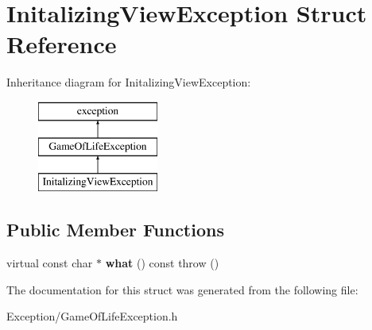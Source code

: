 \hypertarget{struct_initalizing_view_exception}{}\section{Initalizing\+View\+Exception Struct Reference}
\label{struct_initalizing_view_exception}
Inheritance diagram for Initalizing\+View\+Exception\+:\begin{figure}[H]
\begin{center}
\leavevmode
\includegraphics[height=3.000000cm]{struct_initalizing_view_exception}
\end{center}
\end{figure}
\subsection*{Public Member Functions}
\begin{DoxyCompactItemize}
\item 
\hypertarget{struct_initalizing_view_exception_a215743c6d4bca4afd3d7581f433d1b4c}{}virtual const char $\ast$ {\bfseries what} () const   throw ()\label{struct_initalizing_view_exception_a215743c6d4bca4afd3d7581f433d1b4c}

\end{DoxyCompactItemize}


The documentation for this struct was generated from the following file\+:\begin{DoxyCompactItemize}
\item 
Exception/Game\+Of\+Life\+Exception.\+h\end{DoxyCompactItemize}
